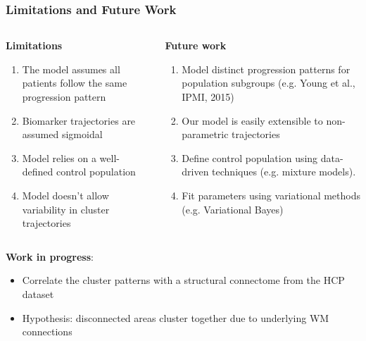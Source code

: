 \documentclass[8pt,xcolor=table]{beamer}
\begin{document}
\begin{frame}
\frametitle{Limitations and Future Work}


\begin{columns}[T]
    \begin{column}{.45\textwidth}
    \textbf{Limitations}
    \begin{enumerate}
     \item The model assumes all patients follow the same progression pattern \break
     \item Biomarker trajectories are assumed sigmoidal
     \item Model relies on a well-defined control population \break
     \item Model doesn't allow variability in cluster trajectories
    \end{enumerate}
    \end{column}
    
    \begin{column}{.45\textwidth}
    \textbf{Future work}
    \begin{enumerate}
     \item Model distinct progression patterns for population subgroups (e.g. Young et al., IPMI, 2015)
     \item Our model is easily extensible to non-parametric trajectories
     \item Define control population using data-driven techniques (e.g. mixture models).
     \item Fit parameters using variational methods (e.g. Variational Bayes)
    \end{enumerate}
    
    \end{column}
  \end{columns}
  
  \vspace{2em}
  
\textbf{Work in progress}:
\begin{itemize}
 \item Correlate the cluster patterns with a structural connectome from the HCP dataset
 \item Hypothesis: disconnected areas cluster together due to underlying WM connections
\end{itemize}


\end{frame}
\end{document}

